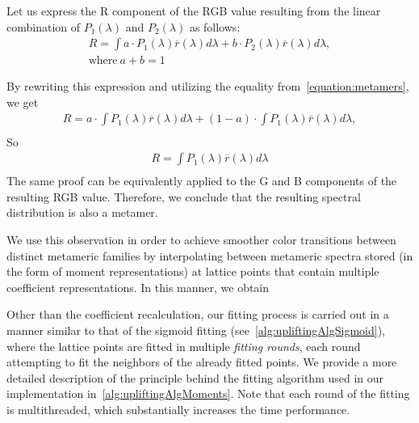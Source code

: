 Let us express the R component of the RGB value resulting from the linear combination of $P_1(\lambda)$ and $P_2(\lambda)$ as follows:
\begin{equation}
\begin{aligned}
R = \int a \cdot P_1(\lambda)\overline{r}(\lambda)d\lambda + 
b \cdot P_2(\lambda)\overline{r}(\lambda)d\lambda,\\
\text{where}\ a + b = 1
\end{aligned}
\end{equation}

By rewriting this expression and utilizing the equality from~\cref{equation:metamers}, we get
\begin{equation*}
\begin{aligned}
R = a \cdot \int P_1(\lambda)\overline{r}(\lambda)d\lambda +
(1-a) \cdot \int P_1(\lambda)\overline{r}(\lambda)d\lambda,\\
\end{aligned}
\end{equation*}
So
\begin{equation*}
\begin{aligned}
R = \int P_1(\lambda)\overline{r}(\lambda)d\lambda\\
\end{aligned}
\end{equation*}
The same proof can be equivalently applied to the G and B components of the resulting RGB value. Therefore, we conclude that the resulting spectral distribution is also a metamer.

We use this observation in order to achieve smoother color transitions between distinct metameric families by interpolating between metameric spectra stored (in the form of moment representations) at lattice points that contain multiple coefficient representations. In this manner, we obtain 

Other than the coefficient recalculation, our fitting process is carried out in a manner similar to that of the sigmoid fitting (see~\cref{alg:upliftingAlgSigmoid}), where the lattice points are fitted in multiple \emph{fitting rounds}, each round attempting to fit the neighbors of the already fitted points. We provide a more detailed description of the principle behind the fitting algorithm used in our implementation in~\cref{alg:upliftingAlgMoments}. Note that each round of the fitting is multithreaded, which substantially increases the time performance.

